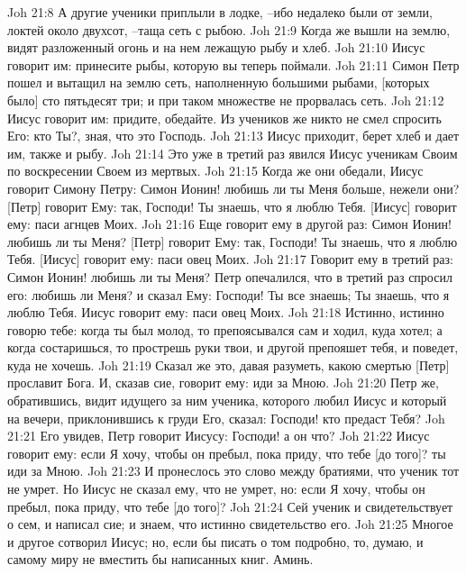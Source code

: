 Joh 21:8  А другие ученики приплыли в лодке, --ибо недалеко были от земли, локтей около двухсот, --таща сеть с рыбою.
Joh 21:9  Когда же вышли на землю, видят разложенный огонь и на нем лежащую рыбу и хлеб.
Joh 21:10  Иисус говорит им: принесите рыбы, которую вы теперь поймали.
Joh 21:11  Симон Петр пошел и вытащил на землю сеть, наполненную большими рыбами, [которых было] сто пятьдесят три; и при таком множестве не прорвалась сеть.
Joh 21:12  Иисус говорит им: придите, обедайте. Из учеников же никто не смел спросить Его: кто Ты?, зная, что это Господь.
Joh 21:13  Иисус приходит, берет хлеб и дает им, также и рыбу.
Joh 21:14  Это уже в третий раз явился Иисус ученикам Своим по воскресении Своем из мертвых.
Joh 21:15  Когда же они обедали, Иисус говорит Симону Петру: Симон Ионин! любишь ли ты Меня больше, нежели они? [Петр] говорит Ему: так, Господи! Ты знаешь, что я люблю Тебя. [Иисус] говорит ему: паси агнцев Моих.
Joh 21:16  Еще говорит ему в другой раз: Симон Ионин! любишь ли ты Меня? [Петр] говорит Ему: так, Господи! Ты знаешь, что я люблю Тебя. [Иисус] говорит ему: паси овец Моих.
Joh 21:17  Говорит ему в третий раз: Симон Ионин! любишь ли ты Меня? Петр опечалился, что в третий раз спросил его: любишь ли Меня? и сказал Ему: Господи! Ты все знаешь; Ты знаешь, что я люблю Тебя. Иисус говорит ему: паси овец Моих.
Joh 21:18  Истинно, истинно говорю тебе: когда ты был молод, то препоясывался сам и ходил, куда хотел; а когда состаришься, то прострешь руки твои, и другой препояшет тебя, и поведет, куда не хочешь.
Joh 21:19  Сказал же это, давая разуметь, какою смертью [Петр] прославит Бога. И, сказав сие, говорит ему: иди за Мною.
Joh 21:20  Петр же, обратившись, видит идущего за ним ученика, которого любил Иисус и который на вечери, приклонившись к груди Его, сказал: Господи! кто предаст Тебя?
Joh 21:21  Его увидев, Петр говорит Иисусу: Господи! а он что?
Joh 21:22  Иисус говорит ему: если Я хочу, чтобы он пребыл, пока приду, что тебе [до того]? ты иди за Мною.
Joh 21:23  И пронеслось это слово между братиями, что ученик тот не умрет. Но Иисус не сказал ему, что не умрет, но: если Я хочу, чтобы он пребыл, пока приду, что тебе [до того]?
Joh 21:24  Сей ученик и свидетельствует о сем, и написал сие; и знаем, что истинно свидетельство его.
Joh 21:25  Многое и другое сотворил Иисус; но, если бы писать о том подробно, то, думаю, и самому миру не вместить бы написанных книг. Аминь.


